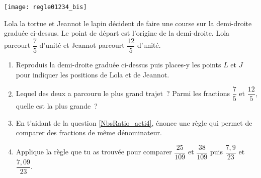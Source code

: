 \begin{activite}

\begin{center} \texttt{[image: regle01234\_bis]} \end{center}

Lola la tortue et Jeannot le lapin décident de faire une course sur la demi-droite graduée ci-dessus. Le point de départ est l'origine de la demi-droite. Lola parcourt $\dfrac{7}{5}$ d'unité et Jeannot parcourt $\dfrac{12}{5}$ d'unité.

\begin{enumerate}
 \item Reproduis la demi-droite graduée ci-dessus puis places-y les points $L$ et $J$ pour indiquer les positions de Lola et de Jeannot. 
 \item Lequel des deux a parcouru le plus grand trajet ? Parmi les fractions $\dfrac{7}{5}$ et $\dfrac{12}{5}$, quelle est la plus grande ? \label{NbsRatio_acti4}
 \item En t'aidant de la question \ref{NbsRatio_acti4}, énonce une règle qui permet de comparer des fractions de même dénominateur. 
 \item Applique la règle que tu as trouvée pour comparer $\dfrac{25}{109}$ et $\dfrac{38}{109}$ puis $\dfrac{7,9}{23}$ et $\dfrac{7,09}{23}$.
\end{enumerate}

\end{activite}


